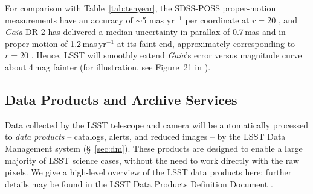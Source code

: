 For comparison with Table~\ref{tab:tenyear}, the SDSS-POSS proper-motion measurements have an
accuracy of $\sim$5 mas yr$^{-1}$ per coordinate at $r=20$ \citep{2004AJ....127.3034M}, and
\textit{Gaia} DR 2 has delivered a median uncertainty in parallax of 0.7\,mas and in proper-motion
of 1.2\,mas\,yr$^{-1}$ at its faint end, approximately corresponding to $r=20$
\citep{2018A&A...616A...1G,2018A&A...616A...2L}. Hence, LSST will smoothly extend \textit{Gaia}'s error
versus magnitude curve about 4\,mag fainter (for illustration, see Figure~21 in \citealt{2012ARA&A..50..251I}).


\subsection{Data Products and Archive Services }
\label{Sec:dp}

Data collected by the LSST telescope and camera will be automatically processed to \emph{data products} -- catalogs, alerts,
and reduced images -- by the LSST Data Management system
(\S~\ref{sec:dm}). These products are designed to
enable a large majority of LSST science cases, without the need to
work directly with the raw pixels.  We give a high-level overview of
the LSST data products here; further details may be found in the LSST
Data Products Definition Document \citep{LSE-163}.


